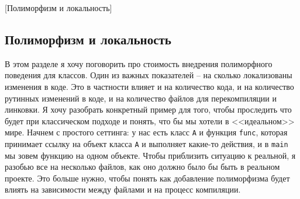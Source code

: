 [Полиморфизм и локальность]


\subsection{Полиморфизм и локальность}
\label{section::Locality}

В этом разделе я хочу поговорить про стоимость внедрения полиморфного поведения для классов.
Один из важных показателей -- на сколько локализованы изменения в коде.
Это в частности влияет и на количество кода, и на количество рутинных изменений в коде, и на количество файлов для перекомпиляции и линковки.
Я хочу разобрать конкретный пример для того, чтобы проследить что будет при классическом подходе и понять, что бы мы хотели в <<идеальном>> мире.
Начнем с простого сеттинга: у нас есть класс \verb"A" и функция \verb"func", которая принимает ссылку на объект класса \verb"A" и выполняет какие-то действия, и в \verb"main" мы зовем функцию на одном объекте.
Чтобы приблизить ситуацию к реальной, я разобью все на несколько файлов, как оно должно было бы быть в реальном проекте.
Это больше нужно, чтобы понять как добавление полиморфизма будет влиять на зависимости между файлами и на процесс компиляции.
